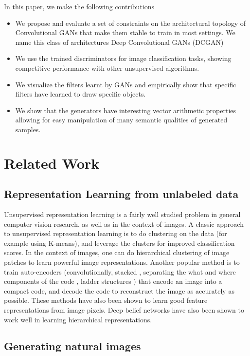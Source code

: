 In this paper, we make the following contributions
\begin{itemize}  
    \item We propose and evaluate a set of constraints on the architectural topology of Convolutional GANs that make them stable to train in most settings. We name this class of architectures Deep Convolutional GANs (DCGAN)
    \item We use the trained discriminators for image classification tasks, showing competitive performance with other unsupervised algorithms.
    \item We visualize the filters learnt by GANs and empirically show that specific filters have learned to draw specific objects.
    \item We show that the generators have interesting vector arithmetic properties allowing for easy manipulation of many semantic qualities of generated samples.
\end{itemize}

\section{Related Work}
\subsection{Representation Learning from unlabeled data}
Unsupervised representation learning is a fairly well studied problem in general computer vision research, as well as in the context of images. A classic approach to unsupervised representation learning is to do clustering on the data (for example using K-means), and leverage the clusters for improved classification scores. In the context of images, one can do hierarchical clustering of image patches \citep{coates2012learning} to learn powerful image representations. Another popular method is to train auto-encoders (convolutionally, stacked \citep{vincent2010stacked}, separating the what and where components of the code \citep{zhao2015stacked}, ladder structures \citep{rasmus2015semi}) that encode an image into a compact code, and decode the code to reconstruct the image as accurately as possible. These methods have also been shown to learn good feature representations from image pixels. Deep belief networks \citep{lee2009convolutional} have also been shown to work well in learning hierarchical representations.

\subsection{Generating natural images}

